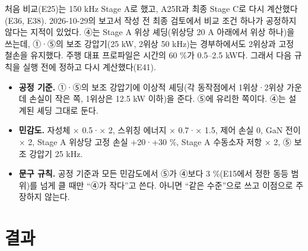 처음 비교(E25)는 150 kHz Stage A로 했고, A25R과 최종 Stage C로 다시 계산했다(E36, E38). 2026-10-29의 보고서 작성 전 최종 검토에서 비교 조건 하나가 공정하지 않다는 지적이 있었다. ④는 Stage A 위상 셰딩(위상당 20 A 아래에서 위상 하나)을 쓰는데, ①·⑤의 보조 강압기(25 kW, 2위상 50 kHz)는 경부하에서도 2위상과 고정 철손을 유지했다. 주행 대표 프로파일은 시간의 60 \%가 0.5–2.5 kW다. 그래서 다음 규칙을 실행 전에 정하고 다시 계산했다(E41).

\begin{itemize}
\item \textbf{공정 기준.} ①·⑤의 보조 강압기에 이상적 셰딩(각 동작점에서 1위상·2위상 가운데 손실이 작은 쪽, 1위상은 12.5 kW 이하)을 준다. ⑤에 유리한 쪽이다. ④는 설계된 셰딩 그대로 둔다.
\item \textbf{민감도.} 자성체 × 0.5·× 2, 스위칭 에너지 × 0.7·× 1.5, 제어 손실 0, GaN 전이 × 2, Stage A 위상당 고정 손실 +20·+30 \%, Stage A 수동소자 저항 × 2, ⑤ 보조 강압기 25 kHz.
\item \textbf{문구 규칙.} 공정 기준과 모든 민감도에서 ⑤가 ④보다 3 \%(E15에서 정한 동등 범위)를 넘게 클 때만 “④가 작다”고 쓴다. 아니면 “같은 수준”으로 쓰고 이점으로 주장하지 않는다.
\end{itemize}

\section{결과}

